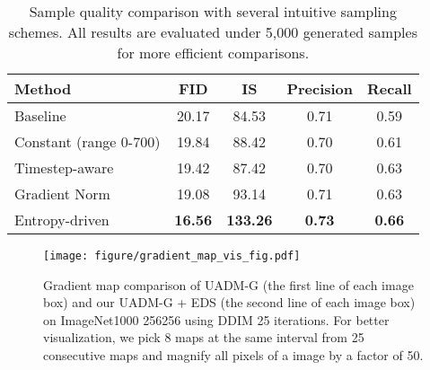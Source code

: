 \documentclass[runningheads]{llncs}
\begin{document}
\begin{table}[t]
    \setlength\tabcolsep{3.5mm}
    \caption{Sample quality comparison with several intuitive sampling schemes. All results are evaluated under 5,000 generated samples for more efficient comparisons.}\label{tab:ablation_EDS}
    \begin{center}
\begin{tabular}[t]{lcccc}
    \toprule
    Method            & FID          & IS       & Precision      & Recall \\
\toprule
    Baseline  & 20.17        & 84.53          & 0.71          & 0.59       \\
Constant (range 0-700)      & 19.84	       & 88.42          & 0.70	         & 0.61       \\
    Timestep-aware & 19.42    & 87.42          & 0.70	         & 0.63       \\
Gradient Norm               & 19.08     & 93.14     & 0.71          & 0.63       \\
    Entropy-driven  & \bf 16.56    & \bf 133.26     & \bf 0.73          & \bf 0.66       \\
    \toprule
    \end{tabular}
\end{center}
    \vspace{-1pt}
\end{table} \begin{figure}[!t]
    \vspace{-3pt}
    \begin{center}
    \texttt{[image: figure/gradient\_map\_vis\_fig.pdf]}
    \caption{Gradient map comparison of UADM-G \cite{dhariwal2021diffusion} (the first line of each image box) and our UADM-G + EDS (the second line of each image box) on ImageNet1000 256256 using DDIM 25 iterations. For better visualization, we pick 8 maps at the same interval from 25 consecutive maps and magnify all pixels of a image by a factor of 50.
    }\label{fig:grad_vis}
    \end{center}
    \vspace{-8mm}
\end{figure}
\end{document}

